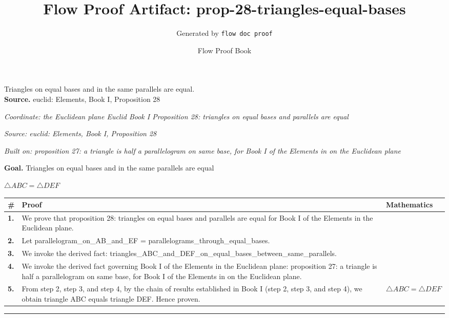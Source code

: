 \documentclass[11pt]{article}
\title{Flow Proof Artifact: prop-28-triangles-equal-bases}
\author{Generated by \texttt{flow doc proof}}
\date{Flow Proof Book}
\theoremstyle{definition}
\begin{document}
\maketitle
Triangles on equal bases and in the same parallels are equal.\\[0.5em]
\textbf{Source.} euclid: Elements, Book I, Proposition 28\\[0.5em]
\bigskip
{}\par
\smallskip\noindent\textit{Coordinate: the Euclidean plane \cdot Euclid Book I \cdot Proposition 28: triangles on equal bases and parallels are equal}\par
\smallskip\noindent\textit{Source: euclid: Elements, Book I, Proposition 28}\par
\smallskip\noindent\textit{Built on: proposition 27: a triangle is half a parallelogram on same base, for Book I of the Elements in on the Euclidean plane}\par
\medskip
\noindent\textbf{Goal.} Triangles on equal bases and in the same parallels are equal\par
\noindent$\displaystyle \triangle ABC = \triangle DEF$\par
\medskip
\noindent
\begin{tabular}{@{} >{\raggedright\arraybackslash}p{} >{\raggedright\arraybackslash}p{} >{\raggedleft\arraybackslash}p{} @{}}
\textbf{\#} & \textbf{Proof} & \textbf{Mathematics} \\
\midrule
\textbf{1.} & We prove that proposition 28: triangles on equal bases and parallels are equal for Book I of the Elements in the Euclidean plane. & \\[0.45em]
\textbf{2.} & Let parallelogram\_on\_AB\_and\_EF = parallelograms\_through\_equal\_bases. & \\[0.45em]
\textbf{3.} & We invoke the derived fact: triangles\_ABC\_and\_DEF\_on\_equal\_bases\_between\_same\_parallels. & \\[0.45em]
\textbf{4.} & We invoke the derived fact governing Book I of the Elements in the Euclidean plane: proposition 27: a triangle is half a parallelogram on same base, for Book I of the Elements in on the Euclidean plane. & \\[0.45em]
\textbf{5.} & From step 2, step 3, and step 4, by the chain of results established in Book I (step 2, step 3, and step 4), we obtain triangle ABC equals triangle DEF. Hence proven. & $\displaystyle \triangle ABC = \triangle DEF$ \\[0.45em]
\bottomrule
\end{tabular}
\label{thm:Geometry-Euclid Book I-proposition_28_triangles_on_equal_bases_and_parallels_are_equal}
\par\medskip\hrule
\end{document}
